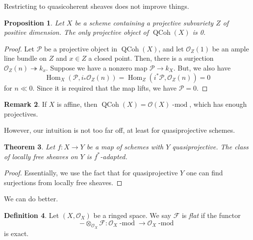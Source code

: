 \documentclass[10pt]{article}
\newtheorem{thm}{Theorem}[section]
\newtheorem{prop}[thm]{Proposition}
\theoremstyle{definition}
\newtheorem{exmp}[thm]{Example}
\newtheorem{defn}[thm]{Definition}
\newtheorem{rmk}[thm]{Remark}
\DeclareMathOperator{\Hom}{Hom}
\DeclareMathOperator{\dmod}{-mod}
\DeclareMathOperator{\QCoh}{QCoh}
\newcommand{\PP}{\mathbb{P}}
\newcommand{\OO}{\mathcal{O}}
\newcommand{\todo}[1]{\textbf{\textcolor{red}{TODO #1}}}
\begin{document}
Restricting to quasicoherent sheaves does not improve things.
\begin{prop}
Let $X$ be a scheme containing a projective subvariety $Z$ of positive dimension.  The only projective object of $\QCoh(X)$ is 0.
\end{prop}
\begin{proof}
Let $\mathcal{P}$ be a projective object in $\QCoh(X)$, and let $\OO_Z(1)$ be an ample line bundle on $Z$ and $x \in Z$ a closed point.  Then, there is a surjection $\OO_Z(n) \twoheadrightarrow k_x$.  Suppose we have a nonzero map $\mathcal{P} \rightarrow k_X$.  But, we also have
$$\Hom_X(\mathcal{P}, i_* \OO_Z(n)) = \Hom_Z(i^* \mathcal{P}, \OO_Z(n)) = 0$$
for $n \ll 0$.  Since it is required that the map lifts, we have $\mathcal{P} = 0$.%
\end{proof}

\begin{rmk}
If $X$ is affine, then $\QCoh(X) = \OO(X)\dmod$, which has enough projectives.
\end{rmk}


However, our intuition is not too far off, at least for quasiprojective schemes.
\begin{thm}
Let $f: X \rightarrow Y$ be a map of schemes with $Y$ quasiprojective.  The class of locally free sheaves on $Y$ is $f^*$-adapted.
\end{thm}
\begin{proof}
Essentially, we use the fact that for quasiprojective $Y$ one can find surjections from locally free sheaves.
\end{proof}

We can do better.
\begin{defn}
Let $(X, \OO_X)$ be a ringed space.  We say $\mathcal{F}$ is \emph{flat} if the functor
$$- \otimes_{\OO_X} \mathcal{F}: \OO_X\dmod \rightarrow \OO_X\dmod$$
is exact.
\end{defn}
\end{document}
